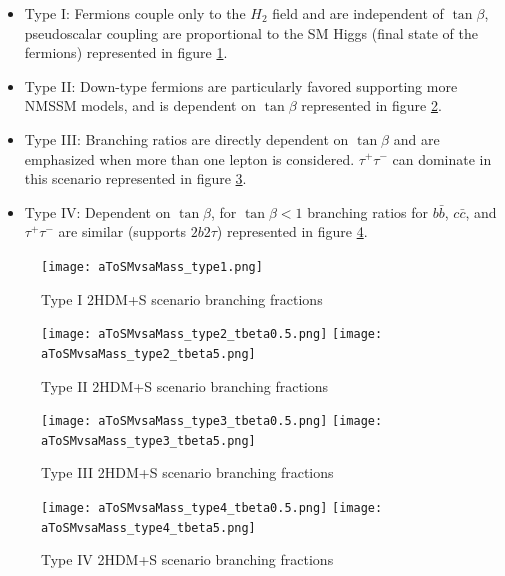 \begin{itemize}
\item Type I: Fermions couple only to the $H_2$ field and are independent of $\tan\beta$, pseudoscalar coupling are proportional to the SM Higgs (final state of the fermions) represented in figure \ref{fig:br2HDM-1}.
\item Type II: Down-type fermions are particularly favored supporting more NMSSM models, and is dependent on $\tan\beta$ represented in figure \ref{fig:br2HDM-2}. 
\item Type III: Branching ratios are directly dependent on $\tan\beta$ and are emphasized when more than one lepton is considered. $\tau^+ \tau^-$ can dominate in this scenario represented in figure \ref{fig:br2HDM-3}. 
\item Type IV: Dependent on $\tan\beta$, for $\tan \beta < 1 $ branching ratios for $b\bar{b}$, $c\bar{c}$, and $\tau^+ \tau^-$ are similar (supports $2b2\tau$) represented in figure \ref{fig:br2HDM-4}.
\end{itemize}


\begin{figure}[ht!b]
  \centering
\texttt{[image: aToSMvsaMass\_type1.png]}           \\
    \caption{\label{fig:br2HDM-1} Type I 2HDM+S scenario branching fractions ~\cite{Branco_2012}}
\end{figure}

\begin{figure}[ht!b]
  \centering
\texttt{[image: aToSMvsaMass\_type2\_tbeta0.5.png]}
\texttt{[image: aToSMvsaMass\_type2\_tbeta5.png]}           \\
    \caption{\label{fig:br2HDM-2} Type II 2HDM+S scenario branching fractions ~\cite{Branco_2012}}
\end{figure}

\begin{figure}[ht!b]
  \centering
\texttt{[image: aToSMvsaMass\_type3\_tbeta0.5.png]}
\texttt{[image: aToSMvsaMass\_type3\_tbeta5.png]}           \\
    \caption{\label{fig:br2HDM-3} Type III 2HDM+S scenario branching fractions ~\cite{Branco_2012}}
\end{figure}



\begin{figure}[ht!b]
  \centering
\texttt{[image: aToSMvsaMass\_type4\_tbeta0.5.png]}
\texttt{[image: aToSMvsaMass\_type4\_tbeta5.png]}           \\
    \caption{\label{fig:br2HDM-4} Type IV 2HDM+S scenario branching fractions ~\cite{Branco_2012}}
\end{figure}

